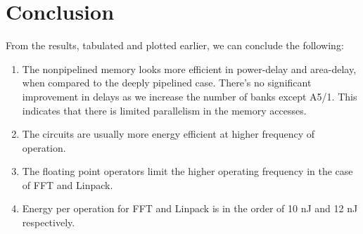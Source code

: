 
\clearpage

\section{Conclusion}

From the results, tabulated and plotted earlier, we can conclude the following:
\begin{enumerate}
\item The nonpipelined memory looks more efficient in power-delay and area-delay, when compared to the deeply pipelined case. 
There's no significant improvement in delays as we increase the number of banks except A5/1.
This indicates that there is limited parallelism in the memory accesses.
\item The circuits are usually more energy efficient at higher frequency of operation.
\item The floating point operators limit the higher operating frequency in the case of FFT and Linpack.
\item Energy per operation for FFT and Linpack is in the order of 10 nJ and 12 nJ respectively. 
\end{enumerate}

